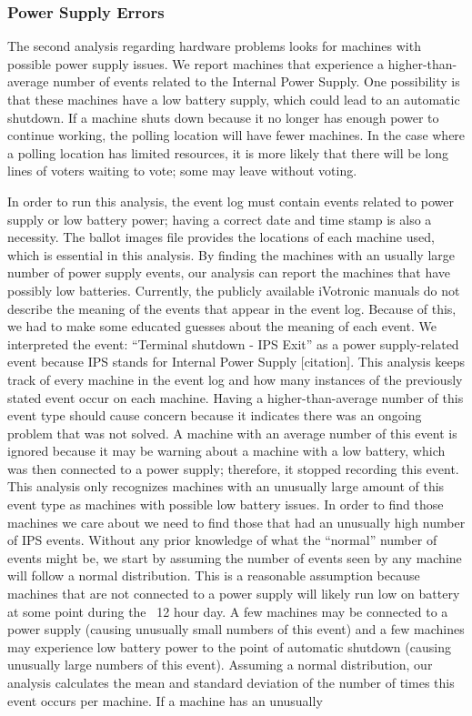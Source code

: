 \subsubsection{Power Supply Errors}
The second analysis regarding hardware problems looks for machines with possible power supply issues.  We report machines that experience a higher-than-average number of events related to the Internal Power Supply. One possibility is that these machines have a low battery supply, which could lead to an automatic shutdown.  If a machine shuts down because it no longer has enough power to continue working, the polling location will have fewer machines.  In the case where a polling location has limited resources, it is more likely that there will be long lines of voters waiting to vote; some may leave without voting.  

In order to run this analysis, the event log must contain events related to power supply or low battery power; having a correct date and time stamp is also a necessity.  The ballot images file provides the locations of each machine used, which is essential in this analysis.  By finding the machines with an usually large number of power supply events, our analysis can report the machines that have possibly low batteries.  Currently, the publicly available iVotronic manuals do not describe the meaning of the events that appear in the event log.  Because of this, we had to make some educated guesses about the meaning of each event.  We interpreted the event: \textquotedblleft Terminal shutdown - IPS Exit\textquotedblright \hspace{1 mm} as a power supply-related event because IPS stands for Internal Power Supply [citation].  This analysis keeps track of every machine in the event log and how many instances of the previously stated event occur on each machine.  Having a higher-than-average number of this event type should cause concern because it indicates there was an ongoing problem that was not solved. A machine with an average number of this event is ignored because it may be warning about a machine with a low battery, which was then connected to a power supply; therefore, it stopped recording this event. This analysis only recognizes machines with an unusually large amount of this event type as machines with possible low battery issues. In order to find those machines we care about we need to find those that had an unusually high number of IPS events. Without any prior knowledge of what the \textquotedblleft normal\textquotedblright \hspace{1 mm} number of events might be, we start by assuming the number of events seen by any machine will follow a normal distribution. This is a reasonable assumption because machines that are not connected to a power supply will likely run low on battery at some point during the ~12 hour day. A few machines may be connected to a power supply (causing unusually small numbers of this event) and a few machines may experience low battery power to the point of automatic shutdown (causing unusually large numbers of this event).  Assuming a normal distribution, our analysis calculates the mean and standard deviation of the number of times this event occurs per machine.  If a machine has an unusually 